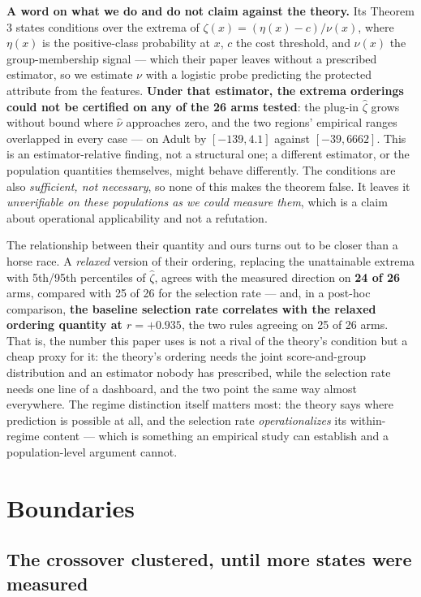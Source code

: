 \documentclass[conference]{IEEEtran}
\begin{document}
\textbf{A word on what we do and do not claim against the theory.} Its Theorem 3 states
conditions over the extrema of $\zeta(x) = (\eta(x)-c)/\nu(x)$, where $\eta(x)$ is the
positive-class probability at $x$, $c$ the cost threshold, and $\nu(x)$ the group-membership
signal --- which their paper leaves without a prescribed estimator, so we estimate $\nu$
with a logistic probe predicting the protected attribute from the features. \textbf{Under
that estimator, the extrema orderings could not be certified on any of the 26 arms tested}:
the plug-in $\hat\zeta$ grows without bound where $\hat\nu$ approaches zero, and the two
regions' empirical ranges overlapped in every case --- on Adult by $[-139, 4.1]$ against
$[-39, 6662]$. This is an estimator-relative finding, not a structural one; a different
estimator, or the population quantities themselves, might behave differently. The
conditions are also \emph{sufficient, not necessary}, so none of this makes the theorem
false. It leaves it \emph{unverifiable on these populations as we could measure them},
which is a claim about operational applicability and not a refutation.

The relationship between their quantity and ours turns out to be closer than a horse race.
A \emph{relaxed} version of their ordering, replacing the unattainable extrema with
5th/95th percentiles of $\hat\zeta$, agrees with the measured direction on \textbf{24 of
26} arms, compared with 25 of 26 for the selection rate --- and, in a post-hoc comparison,
\textbf{the baseline selection rate correlates with the relaxed ordering quantity at
$r = +0.935$}, the two rules agreeing on 25 of 26 arms. That is, the number this
paper uses is not a rival of the theory's condition but a cheap proxy for it: the theory's
ordering needs the joint score-and-group distribution and an estimator nobody has
prescribed, while the selection rate needs one line of a dashboard, and the two point the
same way almost everywhere. The regime distinction itself matters most: the theory says
where prediction is possible at all, and the selection rate \emph{operationalizes} its
within-regime content --- which is something an empirical study can establish and a
population-level argument cannot.

\section{Boundaries}
\label{sec:boundaries}

\subsection{The crossover clustered, until more states were measured}
\end{document}
